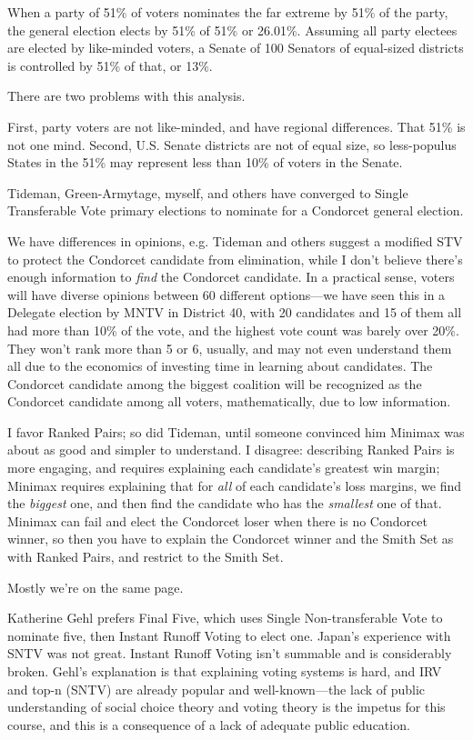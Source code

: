 When a party of 51\% of voters nominates the far extreme by 51\% of the party, the general election elects by 51\% of 51\% or 26.01\%.  Assuming all party electees are elected by like-minded voters, a Senate of 100 Senators of equal-sized districts is controlled by 51\% of that, or 13\%.

There are two problems with this analysis.

First, party voters are not like-minded, and have regional differences.  That 51\% is not one mind.  Second, U.S. Senate districts are not of equal size, so less-populus States in the 51\% may represent less than 10\% of voters in the Senate.

Tideman, Green-Armytage, myself, and others have converged to Single Transferable Vote primary elections to nominate for a Condorcet general election.

We have differences in opinions, e.g. Tideman and others suggest a modified STV to protect the Condorcet candidate from elimination, while I don't believe there's enough information to \textit{find} the Condorcet candidate.  In a practical sense, voters will have diverse opinions between 60 different options—we have seen this in a Delegate election by MNTV in District 40, with 20 candidates and 15 of them all had more than 10\% of the vote, and the highest vote count was barely over 20\%.  They won't rank more than 5 or 6, usually, and may not even understand them all due to the economics of investing time in learning about candidates.  The Condorcet candidate among the biggest coalition will be recognized as the Condorcet candidate among all voters, mathematically, due to low information.

I favor Ranked Pairs; so did Tideman, until someone convinced him Minimax was about as good and simpler to understand.  I disagree:  describing Ranked Pairs is more engaging, and requires explaining each candidate's greatest win margin; Minimax requires explaining that for \textit{all} of each candidate's loss margins, we find the \textit{biggest} one, and then find the candidate who has the \textit{smallest} one of that.  Minimax can fail and elect the Condorcet loser when there is no Condorcet winner, so then you have to explain the Condorcet winner and the Smith Set as with Ranked Pairs, and restrict to the Smith Set.

Mostly we're on the same page.

Katherine Gehl prefers Final Five, which uses Single Non-transferable Vote to nominate five, then Instant Runoff Voting to elect one.  Japan's experience with SNTV was not great.  Instant Runoff Voting isn't summable and is considerably broken.  Gehl's explanation is that explaining voting systems is hard, and IRV and top-n (SNTV) are already popular and well-known—the lack of public understanding of social choice theory and voting theory is the impetus for this course, and this is a consequence of a lack of adequate public education.

